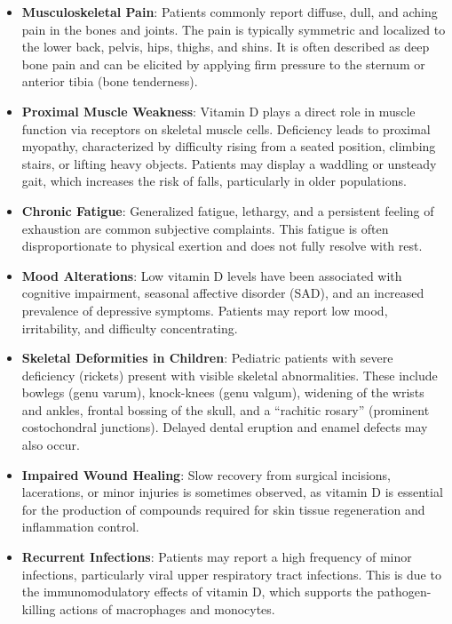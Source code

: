 \begin{itemize}
    \item \textbf{Musculoskeletal Pain}: Patients commonly report diffuse, dull, and aching pain in the bones and joints. The pain is typically symmetric and localized to the lower back, pelvis, hips, thighs, and shins. It is often described as deep bone pain and can be elicited by applying firm pressure to the sternum or anterior tibia (bone tenderness).
    \item \textbf{Proximal Muscle Weakness}: Vitamin D plays a direct role in muscle function via receptors on skeletal muscle cells. Deficiency leads to proximal myopathy, characterized by difficulty rising from a seated position, climbing stairs, or lifting heavy objects. Patients may display a waddling or unsteady gait, which increases the risk of falls, particularly in older populations.
    \item \textbf{Chronic Fatigue}: Generalized fatigue, lethargy, and a persistent feeling of exhaustion are common subjective complaints. This fatigue is often disproportionate to physical exertion and does not fully resolve with rest.
    \item \textbf{Mood Alterations}: Low vitamin D levels have been associated with cognitive impairment, seasonal affective disorder (SAD), and an increased prevalence of depressive symptoms. Patients may report low mood, irritability, and difficulty concentrating.
    \item \textbf{Skeletal Deformities in Children}: Pediatric patients with severe deficiency (rickets) present with visible skeletal abnormalities. These include bowlegs (genu varum), knock-knees (genu valgum), widening of the wrists and ankles, frontal bossing of the skull, and a ``rachitic rosary'' (prominent costochondral junctions). Delayed dental eruption and enamel defects may also occur.
    \item \textbf{Impaired Wound Healing}: Slow recovery from surgical incisions, lacerations, or minor injuries is sometimes observed, as vitamin D is essential for the production of compounds required for skin tissue regeneration and inflammation control.
    \item \textbf{Recurrent Infections}: Patients may report a high frequency of minor infections, particularly viral upper respiratory tract infections. This is due to the immunomodulatory effects of vitamin D, which supports the pathogen-killing actions of macrophages and monocytes.
\end{itemize}

